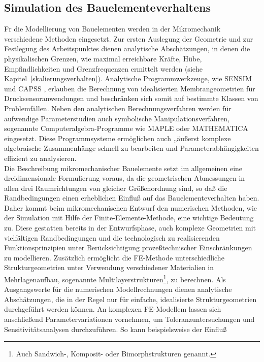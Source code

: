 \subsection{Simulation des Bauelementeverhaltens}
\label{devicemodeling}

Fr die Modellierung von Bauelementen werden in der Mikromechanik
verschiedene Methoden eingesetzt. Zur ersten Auslegung der Geometrie und
zur Festlegung des Arbeitspunktes dienen analytische
Abschätzungen, in denen die physikalischen Grenzen, wie maximal
erreichbare Kräfte, Hübe, Empfindlichkeiten und Grenzfrequenzen
ermittelt werden (siehe Kapitel~\ref{skalierungsverhalten}).
Analytische Programmwerkzeuge,
wie {\sf SENSIM} \cite{Lee82} und {\sf CAPSS} \cite{Bin87},
erlauben die Berechnung
von idealisierten Membrangeometrien für Drucksensoranwendungen und
beschränken sich somit auf bestimmte Klassen von Problemfällen. Neben
den analytischen Berechnungsverfahren werden für aufwendige
Parameterstudien auch symbolische Manipulationsverfahren, sogenannte
Computeralgebra-Programme wie {\sf MAPLE} \cite{Cha91} oder {\sf MATHEMATICA}
\cite{Wol91} eingesetzt. Diese Programmsysteme ermöglichen auch „äußerst
komplexe algebraische Zusammenhänge schnell zu bearbeiten und
Parameterabhängigkeiten effizient zu analysieren.\\
  Die Beschreibung
mikromechanischer Bauelemente setzt im allgemeinen eine dreidimensionale
Formulierung voraus, da die geometrischen Abmessungen in allen drei
Raumrichtungen von gleicher Größenordnung sind, so daß die
Randbedingungen einen erheblichen Einfluß auf das Bauelementeverhalten
haben. Daher kommt beim mikromechanischen Entwurf den numerischen Methoden,
wie der Simulation mit Hilfe der Finite-Elemente-Methode, eine wichtige
Bedeutung zu. Diese gestatten bereits in der Entwurfsphase, auch komplexe
Geometrien mit vielfältigen Randbedingungen und die technologisch zu
realisierenden Funktionsprinzipien unter Berücksichtigung prozeßtechnischer
Einschränkungen zu modellieren. Zusätzlich ermöglicht die FE-Methode
unterschiedliche Strukturgeometrien unter Verwendung
verschiedener Materialien in Mehrlagenaufbau, sogenannte
Multilayerstrukturen\footnote {Auch Sandwich-, Komposit- oder
Bimorphstrukturen genannt.}, zu berechnen. Als Ausgangswerte für die
numerischen Modellrechnungen dienen analytische Abschätzungen, die in
der Regel nur für einfache, idealisierte Strukturgeome\-trien durchgeführt
werden können. An komplexen FE-Modellem lassen sich anschließend
Parametervariationen vornehmen, um Toleranzuntersuchungen und
Sensitivitätsanalysen durchzuführen. So kann beispielsweise der Einfluß
